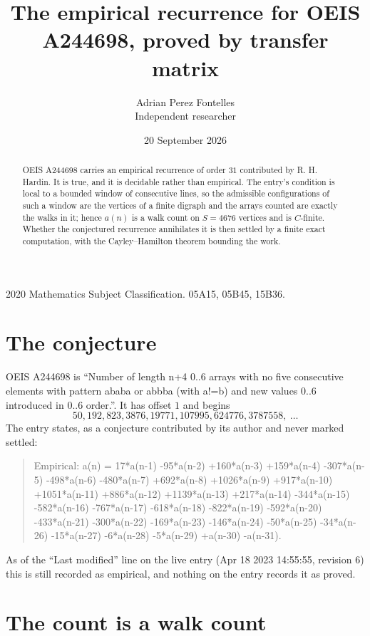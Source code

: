 \documentclass[11pt,a4paper]{article}
\title{The empirical recurrence for OEIS A244698, proved by transfer matrix}
\author{Adrian Perez Fontelles\\ \small Independent researcher}
\date{20 September 2026}
\theoremstyle{plain}
\theoremstyle{definition}
\begin{document}
\maketitle

\begin{abstract}
OEIS A244698 carries an empirical recurrence of order $31$ contributed by R. H. Hardin. It is
true, and it is decidable rather than empirical. The entry's condition is local to a bounded window of consecutive lines, so
the admissible configurations of such a window are the vertices of a finite digraph and the
arrays counted are exactly the walks in it; hence $a(n)$ is a walk count on $S=4676$ vertices
and is $C$-finite. Whether the conjectured recurrence annihilates it is then settled by a
finite exact computation, with the Cayley--Hamilton theorem bounding the work.
\end{abstract}

\noindent\small 2020 Mathematics Subject Classification. 05A15, 05B45, 15B36.\normalsize

\section{The conjecture}

OEIS A244698 is ``Number of length n+4 0..6 arrays with no five consecutive elements with pattern ababa or abbba (with a!=b) and new values 0..6 introduced in 0..6 order.''. It has offset $1$ and begins
\[
50, 192, 823, 3876, 19771, 107995, 624776, 3787558,\ \dots
\]
The entry states, as a conjecture contributed by its author and never marked settled:
\begin{quote}
Empirical: a(n) = 17*a(n-1) -95*a(n-2) +160*a(n-3) +159*a(n-4) -307*a(n-5) -498*a(n-6) -480*a(n-7) +692*a(n-8) +1026*a(n-9) +917*a(n-10) +1051*a(n-11) +886*a(n-12) +1139*a(n-13) +217*a(n-14) -344*a(n-15) -582*a(n-16) -767*a(n-17) -618*a(n-18) -822*a(n-19) -592*a(n-20) -433*a(n-21) -300*a(n-22) -169*a(n-23) -146*a(n-24) -50*a(n-25) -34*a(n-26) -15*a(n-27) -6*a(n-28) -5*a(n-29) +a(n-30) -a(n-31).
\end{quote}
As of the ``Last modified'' line on the live entry (Apr 18 2023 14:55:55, revision 6) this is still
recorded as empirical, and nothing on the entry records it as proved.

\section{The count is a walk count}
\end{document}
